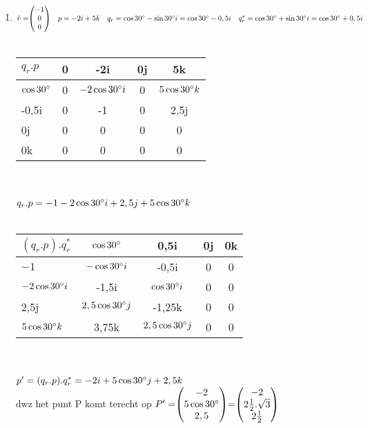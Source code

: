 \begin{enumerate}
	\item
	$\hat{v} = \vecdrie{-1}{0}{0} \quad p = -2i +5k   \\
	\quad q_r = \cos 30 \degree -\sin 30 \degree i  =  \cos 30 \degree - 0,5i \\
	\quad q^*_r =  \cos 30 \degree + \sin 30 \degree i  =  \cos 30 \degree + 0,5i $ \\ \\
	\begin{tabular}{ | l || c | c |c |c |}
		\hline
		$ q_r.p $ & 0 & -2i   & 0j & 5k \\ \hline \hline
		$\cos 30 \degree   $  & 0 &  $-2\cos 30 \degree i  $
		&   0    &  $5\cos 30 \degree k  $ \\ \hline
		-0,5i   & 0 &  -1  &   0       & 2,5j  \\ \hline
		0j   & 0 &  0 &   0    & 0\\ \hline
		0k    & 0  & 0   & 0  & 0\\ 
		\hline 
	\end{tabular} \\ \\
	$ q_r.p = -1 -2\cos 30 \degree i  + 2,5j + 5\cos 30 \degree k $\\ \\
	\begin{tabular}{ | l || c | c |c |c |}
		\hline
		$ (q_r.p).q^*_r $ & $ \cos 30 \degree  $ & 0,5i   & 0j & 0k \\ \hline \hline
		$-1   $   &  $-\cos 30 \degree i  $ & -0,5i	&   0    &  0 \\ \hline
		$ -2\cos 30 \degree i  $ & -1,5i &  $ \cos 30 \degree i  $  &0&0\\ \hline
		2,5j   & $ 2,5\cos 30 \degree j  $ &  -1,25k &   0    & 0\\ \hline
		$ 5\cos 30 \degree k  $    & 3,75k  & $ 2,5\cos 30 \degree j  $    & 0  & 0\\ 
		\hline 
	\end{tabular} \\ \\
	$ p' = (q_r.p).q^*_r = -2i + 5\cos 30 \degree j  + 2,5k $\\
	dwz het punt P komt terecht op $ P' = \vecdrie{-2}{5\cos 30 \degree}{2,5}
	= \vecdrie{-2}{2\frac{1}{2}. \sqrt{3}}{2\frac{1}{2}} $
	
	
	
\end{enumerate}

